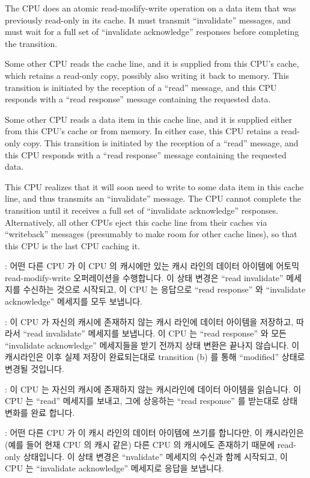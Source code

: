 \begin{description}[style=nextline]
\item	[Transition (e):]
	The CPU does an atomic read-modify-write operation on a data item
	that was previously read-only in its cache.
	It must transmit ``invalidate'' messages, and must wait for a
	full set of ``invalidate acknowledge'' responses before completing
	the transition.
\item	[Transition (f):]
	Some other CPU reads the cache line, and it is supplied from
	this CPU's cache, which retains a read-only copy, possibly also
	writing it back to memory.
	This transition is initiated by the reception of a ``read''
	message, and this CPU responds with a ``read response'' message
	containing the requested data.
\item	[Transition (g):]
	Some other CPU reads a data item in this cache line,
	and it is supplied either from this CPU's cache or from memory.
	In either case, this CPU retains a read-only copy.
	This transition is initiated by the reception of a ``read''
	message, and this CPU responds with a ``read response'' message
	containing the requested data.
\item	[Transition (h):]
	This CPU realizes that it will soon need to write to some data
	item in this cache line, and thus transmits an ``invalidate'' message.
	The CPU cannot complete the transition until it receives a full
	set of ``invalidate acknowledge'' responses.
	Alternatively, all other CPUs eject this cache line from
	their caches via ``writeback'' messages (presumably to make room
	for other cache lines),
	so that this CPU is the last CPU caching it.
\fi
\item	[상태 변화 (i)]:
	어떤 다른 CPU 가 이 CPU 의 캐시에만 있는 캐시 라인의 데이터 아이템에
	어토믹 read-modify-write 오퍼레이션을 수행합니다.
	이 상태 변경은 ``read invalidate'' 메세지를 수신하는 것으로 시작되고,
	이 CPU 는 응답으로 ``read response'' 와 ``invalidate acknowledge''
	메세지를 모두 보냅니다.
\item	[상태 변화 (j)]:
	이 CPU 가 자신의 캐시에 존재하지 않는 캐시 라인에 데이터 아이템을
	저장하고, 따라서 ``read invalidate'' 메세지를 보냅니다.
	이 CPU 는 ``read response'' 와 모든 ``invalidate acknowledge''
	메세지들을 받기 전까지 상태 변환은 끝나지 않습니다.
	이 캐시라인은 이후 실제 저장이 완료되는대로 transition (b) 를 통해
	``modified'' 상태로 변경될 것입니다.
\item	[상태 변화 (k)]:
	이 CPU 는 자신의 캐시에 존재하지 않는 캐시라인에 데이터 아이템을
	읽습니다.
	이 CPU 는 ``read'' 메세지를 보내고, 그에 상응하는 ``read response'' 를
	받는대로 상태 변화를 완료 합니다.
\item	[상태 변화 (l)]:
	어떤 다른 CPU 가 이 캐시 라인의 데이터 아이템에 쓰기를 합니다만, 이
	캐시라인은 (예를 들어 현재 CPU 의 캐시 같은) 다른 CPU 의 캐시에도
	존재하기 때문에 read-only 상태입니다.
	이 상태 변경은 ``nvalidate'' 메세지의 수신과 함께 시작되고, 이 CPU 는
	``invalidate acknowledge'' 메세지로 응답을 보냅니다.
\iffalse


\end{description}
